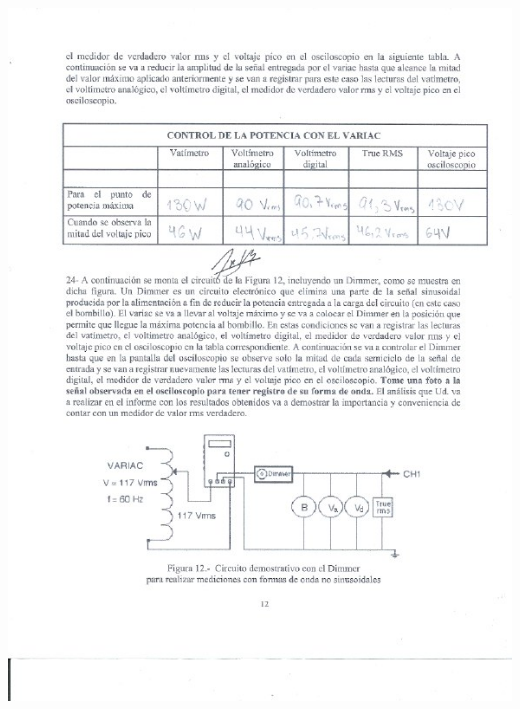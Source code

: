 \documentclass[12pt]{article}
\begin{document}
	\includegraphics[width=16cm,height=21cm]{Img/Resultados_9}\\
	
\end{document}
